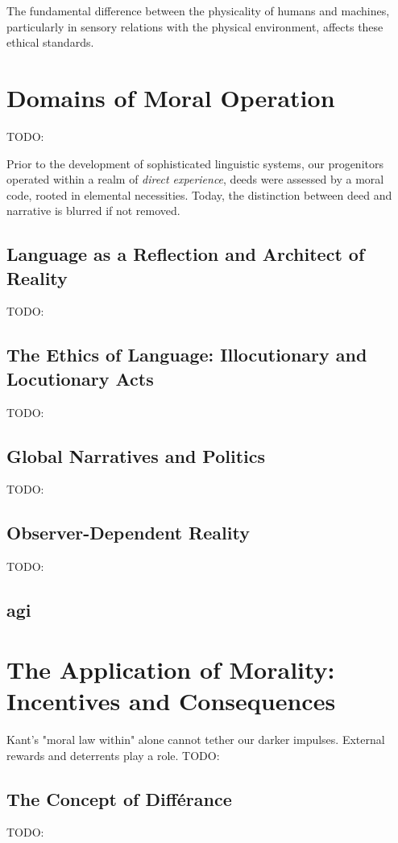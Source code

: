 \documentclass[11pt,a4]{article}
\begin{document}
     The fundamental difference between the physicality of humans and machines, particularly in sensory relations with the physical environment, affects these ethical standards. 
    
    
     

\section{Domains of Moral Operation}
    TODO:

Prior to the development of sophisticated linguistic systems, our progenitors operated within a realm of\textit{ direct experience}, deeds were assessed by a moral code, rooted in elemental necessities. 
Today, the distinction between deed and narrative is blurred if not removed. 

    \subsection{Language as a Reflection and Architect of Reality}
    TODO:
    \subsection{The Ethics of Language: Illocutionary and Locutionary Acts}
    TODO:
    
    \subsection{Global Narratives and Politics}
    TODO:
    
    \subsection{Observer-Dependent Reality}
    TODO:
    
    \subsection{\ac{agi}}

\section{The Application of Morality: Incentives and Consequences}
    
    Kant's "moral law within" alone cannot tether our darker impulses. External rewards and deterrents play a role.
    TODO:

    \subsection{The Concept of Différance}
    TODO:
\end{document}
